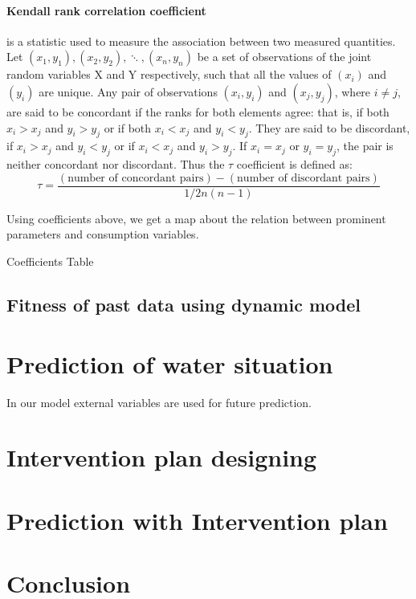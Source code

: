     \paragraph{Kendall rank correlation coefficient} is a statistic used to measure the association between two measured quantities. Let $(x_1, y_1),(x_2, y_2),\ddots,(x_n, y_n)$ be a set of observations of the joint random variables X and Y respectively, such that all the values of $(x_i)$ and $(y_i)$ are unique. Any pair of observations $(x_i,y_i)$ and $(x_j, y_j)$, where $i\neq j$, are said to be concordant if the ranks for both elements agree: that is, if both $x_i > x_j$ and $y_i > y_j$ or if both $x_i < x_j$ and $y_i < y_j$. They are said to be discordant, if $x_i > x_j$ and $y_i < y_j$ or if $x_i < x_j$ and $y_i > y_j$. If $x_i = x_j$ or $y_i = y_j$, the pair is neither concordant nor discordant. Thus the $\tau$ coefficient is defined as\cite{Kendall}\cite{kendalltau}:
    $$
    \tau = \frac{(\text{number of concordant pairs}) - (\text{number of discordant pairs})}{1/2 n (n-1)}
    $$

    Using coefficients above, we get a map about the relation between prominent parameters and consumption variables.

    {\huge Coefficients Table}

  \subsection{Fitness of past data using dynamic model}


\section{Prediction of water situation}
  In our model external variables are used for future prediction.


\section{Intervention plan designing}

\section{Prediction with Intervention plan}

\section{Conclusion}


